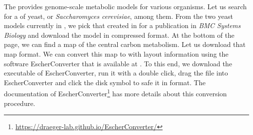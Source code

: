 The \BiGG provides genome-scale metabolic models for various organisms.
Let us search for a \GEM of yeast, or \emph{Saccharomyces cerevisiae}, among them.
From the two yeast models currently in \BiGG, we pick \iMM that \citeauthor{Mo2009} created in \citeyear{Mo2009} for a publication in \emph{BMC Systems Biology} and download the model in compressed \SBML format.
At the bottom of the page, we can find a map of the central carbon metabolism.
Let us download that map \JSON format.
We can convert this map to \SBML with layout information using the software EscherConverter \citep{King2015a} that is available at .
To this end, we download the executable \JAR of EscherConverter, run it with a double click, drag the \JSON file into EscherConverter and click the disk symbol to safe it in \SBML format.
The documentation of EscherConverter\footnote{\url{https://draeger-lab.github.io/EscherConverter/}} has more details about this conversion procedure.

